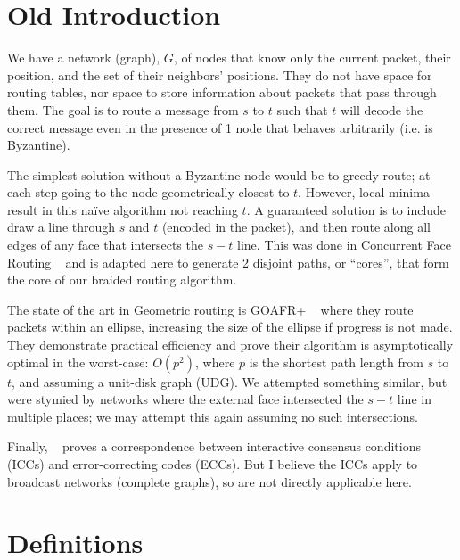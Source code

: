\documentclass{llncs}
\begin{document}
\newpage

\section{Old Introduction}

We have a network (graph), \(G\), of nodes that know only the current packet, their position, and the set of their neighbors' positions.  They do not have space for routing tables, nor space to store information about packets that pass through them.  The goal is to route a message from \(s\) to \(t\) such that \(t\) will decode the correct message even in the presence of 1 node that behaves arbitrarily (i.e. is Byzantine).


The simplest solution without a Byzantine node would be to greedy route; at each step going to the node geometrically closest to \(t\). However, local minima result in this naïve algorithm not reaching \(t\). A guaranteed solution is to include draw a line through \(s\) and \(t\) (encoded in the packet), and then route along all edges of any face that intersects the \(s-t\) line. This was done in Concurrent Face Routing ~\cite{CFR} and is adapted here to generate 2 disjoint paths, or ``cores'', that form the core of our braided routing algorithm.

The state of the art in Geometric routing is GOAFR+ ~\cite{KuhnWattenhofer} where they route packets within an ellipse, increasing the size of the ellipse if progress is not made. They demonstrate practical efficiency and prove their algorithm is asymptotically optimal in the worst-case: \(O(p^2)\), where \(p\) is the shortest path length from \(s\) to \(t\), and assuming a unit-disk graph (UDG). We attempted something similar, but were stymied by networks where the external face intersected the \(s-t\) line in multiple places; we may attempt this again assuming no such intersections.

Finally, ~\cite{ICCs-ECCs} proves a correspondence between interactive consensus conditions (ICCs) and error-correcting codes (ECCs).  But I believe the ICCs apply to broadcast networks (complete graphs), so are not directly applicable here.

\newpage

\section{Definitions}
\end{document}
